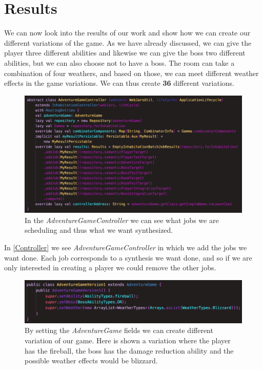\section{Results}
We can now look into the results of our work and show how we can create our different variations of the game. As we have already discussed, we can give the player three different abilities and likewise we can give the boss two different abilities, but we can also choose not to have a boss. The room can take a combination of four weathers, and based on those, we can meet different weather effects in the game variations. We can thus create \textbf{36} different variations.

\begin{figure}[H]
	\centering
	\includegraphics[width=\linewidth]{Materials/Results/AdventureController}
	\caption{In the \textit{AdventureGameController} we can see what jobs we are scheduling and thus what we want synthesized.}
	\label{Controller}
\end{figure}
In \autoref{Controller} we see \textit{AdventureGameController} in which we add the jobs we want done. Each job corresponds to a synthesis we want done, and so if we are only interested in creating a player we could remove the other jobs.

\begin{figure}[H]
	\centering
	\includegraphics[width=\linewidth]{Materials/Results/AdventureVariation}
	\caption{By setting the \textit{AdventureGame} fields we can create different variation of our game. Here is shown a variation where the player has the fireball, the boss has the damage reduction ability and the possible weather effects would be blizzard.}
	\label{version1}
\end{figure}

